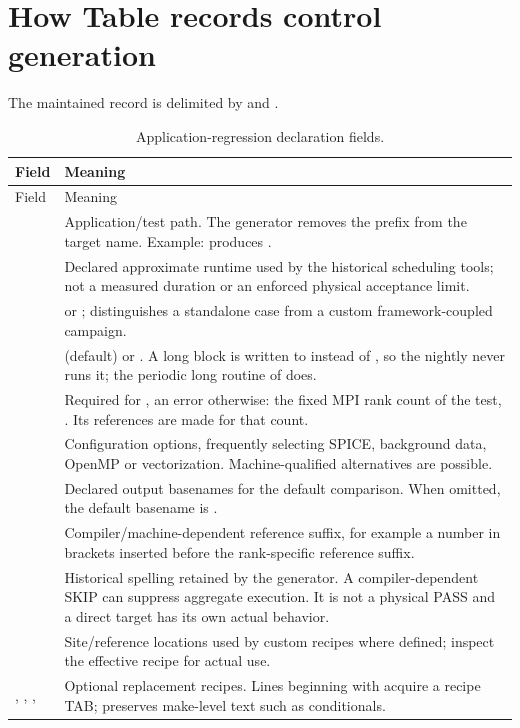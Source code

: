 \section{How Table records control generation}
The maintained record is delimited by \code{#>} and \code{<#}.
\begin{longtable}{L{0.22\textwidth}L{0.68\textwidth}}
\caption{Application-regression declaration fields.}\\
\toprule Field & Meaning\\\midrule\endfirsthead
\toprule Field & Meaning\\\midrule\endhead
{} & Application/test path. The generator removes the
 prefix from the target name. Example:
 produces .\\
 & Declared approximate runtime used by the historical scheduling
tools; not a measured duration or an enforced physical acceptance limit.\\
 &  or ; distinguishes a standalone case
from a custom framework-coupled campaign.\\
 &  (default) or . A long block is
written to  instead of , so the
nightly never runs it; the periodic long routine of 
does.\\
 & Required for , an error otherwise: the fixed
MPI rank count of the test, . Its references are made
for that count.\\
 & Configuration options, frequently selecting SPICE, background
data, OpenMP or vectorization. Machine-qualified alternatives are possible.\\
 & Declared output basenames for the default comparison.
When omitted, the default basename is .\\
 & Compiler/machine-dependent reference suffix, for example a
number in brackets inserted before the rank-specific reference suffix.\\
 & Historical spelling retained by the generator.
A compiler-dependent SKIP can suppress aggregate execution. It is not a
physical PASS and a direct target has its own actual behavior.\\
 & Site/reference locations used by custom
recipes where defined; inspect the effective recipe for actual use.\\
, , ,  & Optional replacement
recipes. Lines beginning with \code{>>>} acquire a recipe TAB; \code{<<<}
preserves make-level text such as conditionals.\\
\bottomrule
\end{longtable}

